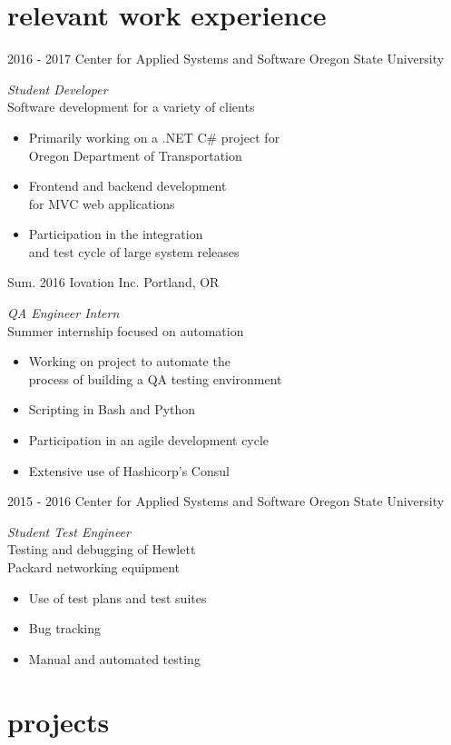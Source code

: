 \documentclass[1]{friggeri-cv} %
\begin{document}
\section{relevant work experience}
\begin{entrylist}
\entry
{2016 - 2017}
{Center for Applied Systems and Software}
{Oregon State University}
{\emph{Student Developer}\hfill \\
Software development for a variety of clients
\begin{itemize}
\item Primarily working on a .NET C\# project for \\
Oregon Department of Transportation
\item Frontend and backend development \\ for MVC web applications
\item Participation in the integration \\ and test cycle of large system releases
\end{itemize}}
\entry
{Sum. 2016}
{Iovation Inc.}
{Portland, OR}
{\emph{QA Engineer Intern}\hfill \\
Summer internship focused on automation
\begin{itemize}
\item Working on project to automate the \\ process of building a QA testing environment
\item Scripting in Bash and Python
\item Participation in an agile development cycle
\item Extensive use of Hashicorp's Consul
\end{itemize}}
\entry
{2015 - 2016}
{Center for Applied Systems and Software}
{Oregon State University}
{\emph{Student Test Engineer}\hfill \\
Testing and debugging of Hewlett \\Packard networking equipment
\begin{itemize}
\item Use of test plans and test suites
\item Bug tracking
\item Manual and automated testing
\end{itemize}}
\end{entrylist}
\section{projects}
\end{document}
